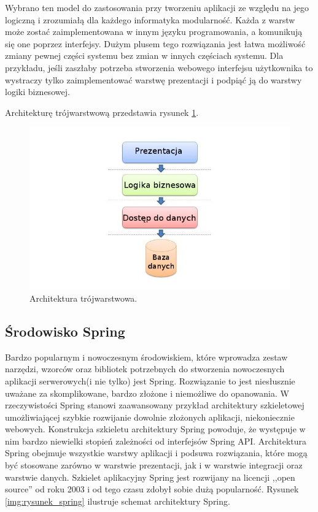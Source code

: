 Wybrano ten model do zastosowania przy tworzeniu aplikacji ze względu na jego logiczną i zrozumiałą dla każdego informatyka modularność. Każda z warstw może zostać zaimplementowana w innym języku programowania, a komunikują się one poprzez interfejsy. Dużym plusem tego rozwiązania jest łatwa możliwość zmiany pewnej części systemu bez zmian w innych częściach systemu. Dla przykładu, jeśli zaszłaby potrzeba stworzenia webowego interfejsu użytkownika to wystraczy tylko zaimplementować warstwę prezentacji i podpiąć ją do warstwy logiki biznesowej.

Architekturę trójwarstwową przedstawia rysunek \ref{img:rysunek_3layer}.
\begin{figure}[!ht]
\centering	
\includegraphics[scale=0.5]{images/3layer-architect}
\caption[Rysunek przedstawiający model architektury trójwarstwowej]{Architektura trójwarstwowa.}
\label{img:rysunek_3layer}
\end{figure}

\subsection{Środowisko Spring}
\label{sec:modelArchitekturySpring}
Bardzo popularnym i nowoczesnym środowiskiem, które wprowadza zestaw narzędzi, wzorców oraz bibliotek potrzebnych do stworzenia nowoczesnych aplikacji serwerowych(i nie tylko) jest Spring. Rozwiązanie to jest niesłusznie uważane za skomplikowane, bardzo złożone i niemożliwe do opanowania. W rzeczywistości Spring stanowi zaawansowany przykład architektury szkieletowej umożliwiającej szybkie rozwijanie dowolnie złożonych aplikacji, niekoniecznie webowych. Konstrukcja szkieletu architektury Spring powoduje, że występuje w nim bardzo niewielki stopień zależności od interfejsów Spring API. Architektura Spring obejmuje wszystkie warstwy aplikacji i podsuwa rozwiązania, które mogą być stosowane zarówno w warstwie prezentacji, jak i w warstwie integracji oraz warstwie danych. Szkielet aplikacyjny Spring jest rozwijany na licencji ,,open source'' od roku 2003 i od tego czasu zdobył sobie dużą popularność\cite{bruce_spring}. Rysunek \ref{img:rysunek_spring} ilustruje schemat architektury Spring.

